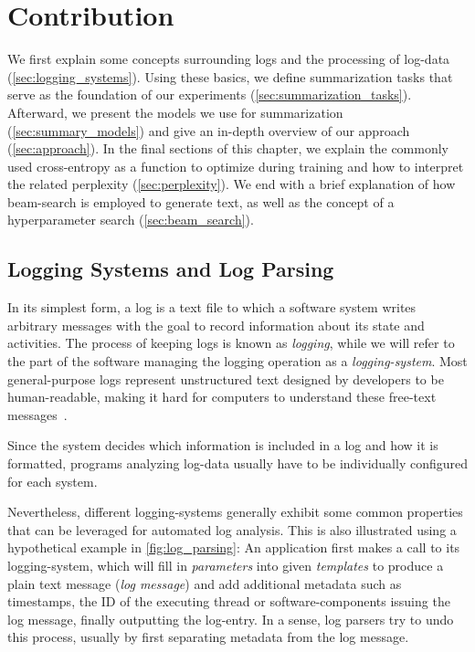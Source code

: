 \chapter{Contribution}\label{ch:contribution}

\acresetall


We first explain some concepts surrounding logs and
the processing of log-data (\autoref{sec:logging_systems}).
Using these basics, we define summarization tasks that serve as the foundation of our experiments (\autoref{sec:summarization_tasks}).
Afterward, we present the models we use for summarization (\autoref{sec:summary_models})
and give an in-depth overview of our approach (\autoref{sec:approach}).
In the final sections of this chapter, we explain the commonly used cross-entropy
as a function to optimize during training and how to interpret the related perplexity (\autoref{sec:perplexity}).
We end with a brief explanation of how beam-search is employed to generate text,
as well as the concept of a hyperparameter search (\autoref{sec:beam_search}).

\section{Logging Systems and Log Parsing}\label{sec:logging_systems}

In its simplest form, a log is a text file to which a software system writes arbitrary messages
with the goal to record information about its state and activities.
The process of keeping logs is known as \emph{logging},
while we will refer to the part of the software managing the logging operation as a \emph{logging-system}.
Most general-purpose logs represent unstructured text designed by developers to be human-readable,
making it hard for computers to understand these free-text messages~\parencite{log_analysis}.

Since the system decides which information is included in a log and how it is formatted,
programs analyzing log-data usually have to be individually configured for each system.

Nevertheless, different logging-systems generally exhibit some common properties
that can be leveraged for automated log analysis.
This is also illustrated using a hypothetical example in \autoref{fig:log_parsing}:
An application first makes a call to its logging-system,
which will fill in \emph{parameters} into given \emph{templates} to produce a plain text message (\emph{log message})
and add additional metadata such as timestamps, the ID of the executing thread or software-components issuing the log message,
finally outputting the log-entry.
In a sense, log parsers try to undo this process, usually by first separating metadata from the log message.


